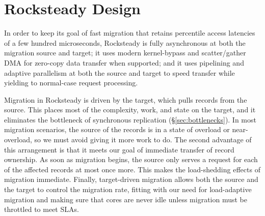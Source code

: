 
\section{Rocksteady Design}
\label{sec:new-design}


In order to keep its goal of fast migration that retains \nnnth percentile
access latencies of a few hundred microseconds, Rocksteady is fully
asynchronous at both the migration source and target; it uses modern kernel-bypass and
scatter/gather DMA for zero-copy data transfer when supported; and it uses
pipelining and adaptive parallelism at both the source and target to speed
transfer while yielding to normal-case request processing.

Migration in Rocksteady is driven by the target, which pulls records from
the source. This places most of the complexity, work, and state on the target,
and it eliminates the bottleneck of synchronous replication
(\S\ref{sec:bottlenecks}). In most migration scenarios, the source of the
records is in a state of overload or near-overload, so we must avoid giving it
 more work to do.
The second advantage of this arrangement is that it meets
our goal of immediate transfer of record ownership. As soon as
migration begins, the source only serves a request for each of
the affected records at most once more. This makes the load-shedding effects
of migration immediate.
Finally, target-driven migration allows both the
source and the target to control the migration rate, fitting with our need
for load-adaptive migration and making sure that cores are never idle unless
migration must be throttled to meet SLAs.


